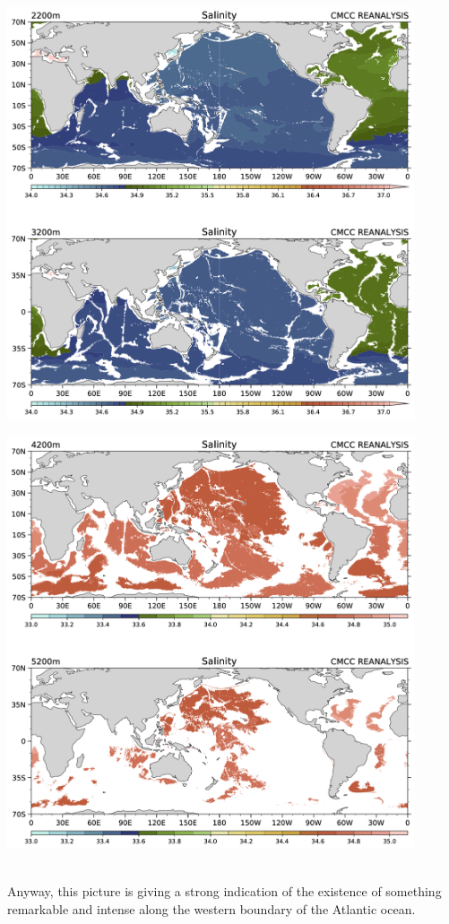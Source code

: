 \begin{minipage}{0.45\textwidth}\label{fig:fig4}
    \includegraphics[width=0.9\textwidth]{uploads/27image.png}
\end{minipage}
\begin{minipage}{0.45\textwidth}
    \includegraphics[width=0.9\textwidth]{uploads/28image.png}
\end{minipage}\\
[0.1 cm]
Anyway,
this picture is giving a strong indication of the existence of something
remarkable and intense along the western boundary of the Atlantic ocean. 


